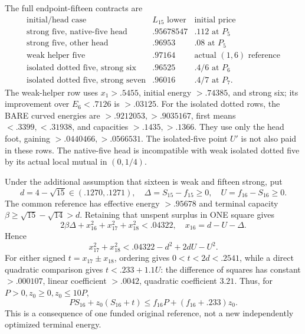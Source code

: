 \documentclass[11pt]{article}
\theoremstyle{definition}
\theoremstyle{remark}
\begin{document}
The full endpoint-fifteen contracts are
\[
\begin{array}{c|c|c}
\text{initial/head case}&L_{15}\text{ lower}&\text{initial price}\\ \hline
\text{strong five, native-five head}&.95678547&.112\text{ at }P_5\\
\text{strong five, other head}&.96953&.08\text{ at }P_5\\
\text{weak helper five}&.97164&\text{actual }(1,6)\text{ reference}\\
\text{isolated dotted five, strong six}&.96525&.4/6\text{ at }P_6\\
\text{isolated dotted five, strong seven}&.96016&.4/7\text{ at }P_7 .
\end{array}
\]
The weak-helper row uses \(x_1>.5455\), initial energy \(>.74385\),
and strong six; its improvement over \(E_6<.7126\) is \(>.03125\).
For the isolated dotted rows, the BARE curved energies are
\(>.9212053,>.9035167\), first means \(<.3399,<.31938\),
and capacities \(>.1435,>.1366\).
They use only the head foot, gaining \(>.0440466,>.0566531\).
The isolated-five point \(U'\) is not also paid in these rows.
The native-five head is incompatible with weak isolated dotted five
by its actual local mutual in \((0,1/4)\).

Under the additional assumption that sixteen is weak and fifteen strong,
put
\[
 d=4-\sqrt{15}\in(.1270,.1271),\quad
 \Delta=S_{15}-f_{15}\geq0,\quad U=f_{16}-S_{16}\geq0 .
\]
The common reference has effective energy \(>.95678\)
and terminal capacity \(\beta\geq\sqrt{15}-\sqrt{14}>d\).
Retaining that unspent surplus in ONE square gives
\[
 2\beta\Delta+x_{16}^2+x_{17}^2+x_{18}^2<.04322,\quad
 x_{16}=d-U-\Delta .
\]
Hence
\[
 x_{17}^2+x_{18}^2<.04322-d^2+2dU-U^2 .
\]
For either signed \(t=x_{17}\pm x_{18}\), ordering gives
\(0<t<2d<.2541\), while a direct quadratic comparison gives
\(t<.233+1.1U\):
the difference of squares has constant \(>.000107\),
linear coefficient \(>.0042\), quadratic coefficient \(3.21\).
Thus, for \(P>0,z_0\geq0,z_0\leq10P\),
\begin{equation}\label{eq:D18centerellipse}
 PS_{16}+z_0(S_{16}+t)
 \leq f_{16}P+(f_{16}+.233)z_0 .
\end{equation}
This is a consequence of one funded original reference, not a new
independently optimized terminal energy.
\end{document}
